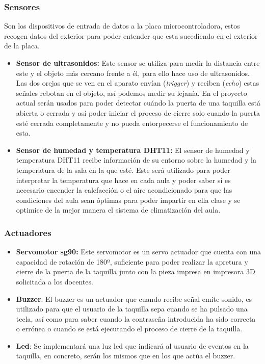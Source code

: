 \documentclass[12pt]{report}
\begin{document}
\subsubsection{Sensores}
 Son los dispositivos de entrada de datos a la placa microcontroladora, estos recogen datos del exterior para poder entender que esta sucediendo en el exterior de la placa. 
 \begin{itemize}
    \item \textbf{Sensor de ultrasonidos:} Este sensor se utiliza para medir la distancia entre este y el objeto más cercano frente a él, para ello hace uso de ultrasonidos. Las dos orejas que se ven en el aparato envían (\textit{trigger}) y reciben (\textit{echo}) estas señales rebotan en el objeto, así podemos medir su lejanía. En el proyecto actual serán usados para poder detectar cuándo la puerta de una taquilla está abierta o cerrada y así poder iniciar el proceso de cierre solo cuando la puerta esté cerrada completamente y no pueda entorpecerse el funcionamiento de esta.
    \item \textbf{Sensor de humedad y temperatura DHT11:} El sensor de humedad y temperatura DHT11 recibe información de su entorno sobre la humedad y la temperatura de la sala en la que esté. Este será utilizado para poder interpretar la temperatura que hace en cada aula y poder saber si es necesario encender la calefacción o el aire acondicionado para que las condiciones del aula sean óptimas para poder impartir en ella clase y se optimice de la mejor manera el sistema de climatización del aula.
 \end{itemize}
\subsubsection{Actuadores}
\begin{itemize}
    \item \textbf{Servomotor sg90: }Este servomotor es un servo actuador que cuenta con una capacidad de rotación de 180º, suficiente para poder realizar la apretura y cierre de la puerta de la taquilla junto con la pieza impresa en impresora 3D solicitada a los docentes.
    \item \textbf{Buzzer}: El buzzer es un actuador que cuando recibe señal emite sonido, es utilizado para que el usuario de la taquilla sepa cuando se ha pulsado una tecla, así como para saber cuando la contraseña introducida ha sido correcta o errónea o cuando se está ejecutando el proceso de cierre de la taquilla.
    \item \textbf{Led}: Se implementará una luz led que indicará al usuario de eventos en la taquilla, en concreto, serán los mismos que en los que actúa el buzzer.
\end{itemize}
\end{document}
